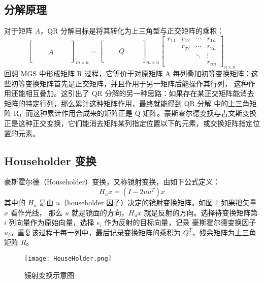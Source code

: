 \subsection{分解原理}
对于矩阵 $A$，QR 分解目标是将其转化为上三角型与正交矩阵的乘积：
\begin{equation}
    \begin{bmatrix}
        \quad & \quad & \quad \\
        \quad & \quad & \quad \\
        \quad & A     & \quad \\
        \quad & \quad & \quad \\
        \quad & \quad & \quad
    \end{bmatrix}_{m\times n}=
    \begin{bmatrix}
        \quad & \quad & \quad \\
        \quad & \quad & \quad \\
        \quad & Q     & \quad \\
        \quad & \quad & \quad \\
        \quad & \quad & \quad
    \end{bmatrix}_{m\times n}
    \begin{bmatrix}
        r_{11} & r_{12} & \cdots & r_{1n} \\
               & r_{22} & \cdots & r_{2n} \\
               &        & \ddots & \vdots \\
               &
               &        & r_{nn}
    \end{bmatrix}_{n\times n}
\end{equation}
回想 MGS 中形成矩阵 R 过程，它等价于对原矩阵 A 每列叠加初等变换矩阵：这些初等变换矩阵首先是正交矩阵，并且作用于另一矩阵后能操作其行列，
这种作用还能相互叠加。这引出了 QR 分解的另一种思路：如果存在某正交矩阵能消去矩阵的特定行列，那么累计这种矩阵作用，最终就能得到 QR 分解
中的上三角矩阵 R，而这种累计作用合成来的矩阵正是 Q 矩阵。豪斯霍尔德变换与吉文斯变换正是这种正交变换，它们能消去矩阵某列指定位置以下的元素，或交换矩阵指定位置的元素。

\subsection{Householder 变换}
豪斯霍尔德（Householder）变换，又称镜射变换，由如下公式定义：
\begin{equation}
    H_ux=(I-2uu^{T})x
\end{equation}
其中的 $H_u$ 是由 $u$（householder 因子）决定的镜射变换矩阵。如图 \ref{householder_transform} 如果把矢量 $x$ 看作光线，
那么 $u$ 就是镜面的方向，$H_ux$ 就是反射的方向。选择待变换矩阵第 $i$ 列向量作为原始向量，选择 $e_i$ 作为反射的目标向量，记录
豪斯霍尔德变换因子 $u_i$。重复该过程于每一列中，最后记录变换矩阵的乘积为 $Q^T$，残余矩阵为上三角矩阵 $R$。
\begin{figure}[htbp]
    \centering\label{householder_transform}
    \texttt{[image: HouseHolder.png]}
    \caption{镜射变换示意图}
\end{figure}
